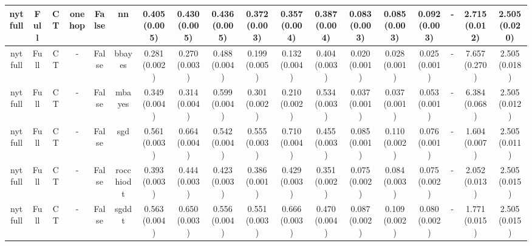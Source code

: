 \documentclass{article}
\begin{document}
{\begin{landscape}
\begin{table}[!h]
{\begin{tabular}{@{}cccccccccccccccccc@{}}
\midrule nytfull & Full & CT & onehop & False & nn & 0.405 (0.005) & 0.430 (0.005) & 0.436 (0.005) & 0.372 (0.003) & 0.357 (0.004) & 0.387 (0.004) & 0.083 (0.003) & 0.085 (0.003) & 0.092 (0.003) &- & 2.715 (0.012) & 2.505 (0.020)\\
\midrule nytfull & Full & CT & - & False & bbayes & 0.281 (0.002) & 0.270 (0.003) & 0.488 (0.004) & 0.199 (0.005) & 0.132 (0.004) & 0.404 (0.003) & 0.020 (0.001) & 0.028 (0.001) & 0.025 (0.001) &- & 7.657 (0.270) & 2.505 (0.018)\\
\midrule nytfull & Full & CT & - & False & mbayes & 0.349 (0.004) & 0.314 (0.004) & 0.599 (0.004) & 0.301 (0.002) & 0.210 (0.002) & 0.534 (0.003) & 0.037 (0.001) & 0.037 (0.001) & 0.053 (0.001) &- & 6.384 (0.068) & 2.505 (0.012)\\
\midrule nytfull & Full & CT & - & False & sgd & 0.561 (0.003) & 0.664 (0.004) & 0.542 (0.004) & 0.555 (0.003) & 0.710 (0.004) & 0.455 (0.003) & 0.085 (0.001) & 0.110 (0.002) & 0.076 (0.001) &- & 1.604 (0.007) & 2.505 (0.011)\\
\midrule nytfull & Full & CT & - & False & rocchiodt & 0.393 (0.003) & 0.444 (0.003) & 0.423 (0.003) & 0.386 (0.001) & 0.429 (0.003) & 0.351 (0.002) & 0.075 (0.002) & 0.084 (0.003) & 0.075 (0.002) &- & 2.052 (0.013) & 2.505 (0.015)\\
\midrule nytfull & Full & CT & - & False & sgddt & 0.563 (0.004) & 0.650 (0.003) & 0.556 (0.004) & 0.551 (0.003) & 0.666 (0.003) & 0.470 (0.004) & 0.087 (0.002) & 0.109 (0.002) & 0.080 (0.002) &- & 1.771 (0.015) & 2.505 (0.015)\\


\end{tabular}}
\end{table}
\end{landscape}}
\end{document}
